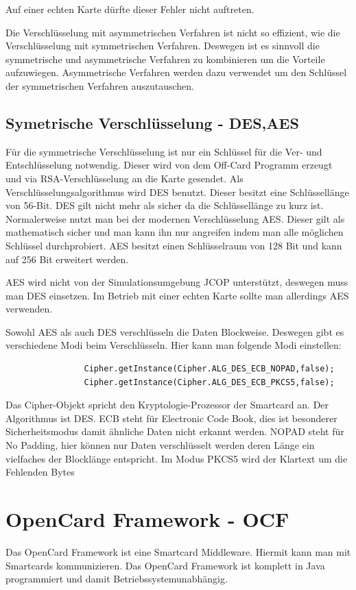 \documentclass[parskip]{scrartcl}
\begin{document}
			Auf einer echten Karte dürfte dieser Fehler nicht auftreten.
		
			Die Verschlüsselung mit asymmetrischen Verfahren ist nicht so effizient, wie die Verschlüsselung mit symmetrischen Verfahren. Deswegen ist es sinnvoll die symmetrische und asymmetrische Verfahren zu kombinieren um die Vorteile aufzuwiegen. Asymmetrische Verfahren werden dazu verwendet um den Schlüssel der symmetrischen Verfahren auszutauschen.
	
		\subsection{Symetrische Verschlüsselung - DES,AES}
			Für die symmetrische Verschlüsselung ist nur ein Schlüssel für die Ver- und Entschlüs\-selung notwendig. Dieser wird von dem Off-Card Programm erzeugt und via RSA-Verschlüs\-selung an die Karte gesendet. Als Verschlüsselungsalgorithmus wird DES benutzt. Dieser besitzt eine Schlüssellänge von 56-Bit. DES gilt nicht mehr als sicher da die Schlüssellänge zu kurz ist. Normalerweise nutzt man bei der modernen Verschlüsselung AES. Dieser gilt als mathematisch sicher und man kann ihn nur angreifen indem man alle möglichen Schlüssel durchprobiert. AES besitzt einen Schlüsselraum von 128 Bit und kann auf 256 Bit erweitert werden.
			
			AES wird nicht von der Simulationsumgebung JCOP unterstützt, deswegen muss man DES einsetzen. Im Betrieb mit einer echten Karte sollte man allerdings AES verwenden.
			
			Sowohl AES als auch DES verschlüsseln die Daten Blockweise. Deswegen gibt es verschiedene Modi beim Verschlüsseln. Hier kann man folgende Modi einstellen:
			
			\begin{lstlisting}
				Cipher.getInstance(Cipher.ALG_DES_ECB_NOPAD,false);
				Cipher.getInstance(Cipher.ALG_DES_ECB_PKCS5,false);
			\end{lstlisting}
			
			Das Cipher-Objekt spricht den Kryptologie-Prozessor der Smartcard an. Der Algorithmus ist DES. ECB steht für Electronic Code Book, dies ist besonderer Sicherheitsmodus damit ähnliche Daten nicht erkannt werden. NOPAD steht für No Padding, hier können nur Daten verschlüsselt werden deren Länge ein vielfaches der Blocklänge entspricht. Im Modus PKCS5 wird der Klartext um die Fehlenden Bytes 
				
	\section{OpenCard Framework - OCF}
		Das OpenCard Framework ist eine Smartcard Middleware. Hiermit kann man mit Smartcards kommunizieren. Das OpenCard Framework ist komplett in Java programmiert und damit Betriebssystemunabhängig.
		
\end{document}
